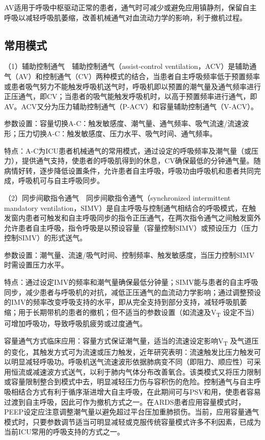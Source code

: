 AV适用于呼吸中枢驱动正常的患者，通气时可减少或避免应用镇静剂，保留自主呼吸以减轻呼吸肌萎缩，改善机械通气对血流动力学的影响，利于撤机过程。

\subsection{常用模式}

（1）辅助控制通气　辅助控制通气（assist-control
ventilation，ACV）是辅助通气（AV）和控制通气（CV）两种模式的结合，当患者自主呼吸频率低于预置频率或患者吸气努力不能触发呼吸机送气时，呼吸机即以预置的潮气量及通气频率进行正压通气，即CV；当患者的吸气能触发呼吸机时，以高于预置频率进行通气，即AV。ACV又分为压力辅助控制通气（P-ACV）和容量辅助控制通气（V-ACV）。

参数设置：容量切换A-C：触发敏感度、潮气量、通气频率、吸气流速/流速波形；压力切换A-C：触发敏感度、压力水平、吸气时间、通气频率。

特点：A-C为ICU患者机械通气的常用模式，通过设定的呼吸频率及潮气量（或压力），提供通气支持，使患者的呼吸肌得到的休息，CV确保最低的分钟通气量。随病情好转，逐步降低设置条件，允许患者自主呼吸，呼吸功由呼吸机和患者共同完成，呼吸机可与自主呼吸同步。

（2）同步间歇指令通气　同步间歇指令通气（synchronized intermittent
mandatory
ventilation，SIMV）是自主呼吸与控制通气相结合的呼吸模式，在触发窗内患者可触发和自主呼吸同步的指令正压通气，在两次指令通气之间触发窗外允许患者自主呼吸，指令呼吸是以预设容量（容量控制SIMV）或预设压力（压力控制SIMV）的形式送气。

参数设置：潮气量、流速/吸气时间、控制频率、触发敏感度，当压力控制SIMV时需设置压力水平。

特点：通过设定IMV的频率和潮气量确保最低分钟量；SIMV能与患者的自主呼吸同步，减少患者与呼吸机的对抗，减低正压通气的血流动力学影响；通过调整预设的IMV的频率改变呼吸支持的水平，即从完全支持到部分支持，减轻呼吸肌萎缩；用于长期带机的患者的撤机；但不适当的参数设置（如流速及V\textsubscript{T}
设定不当）可增加呼吸功，导致呼吸肌疲劳或过度通气。

容量通气方式临床应用：容量方式保证潮气量，适当的流速设定影响V\textsubscript{T}
及气道压的变化，其触发方式可为流速或压力触发，近年研究表明：流速触发比压力触发可以明显减轻呼吸功。呼吸机送气流速波形依据肺病变不同（即阻力、顺应性）可采用恒流或减速波方式送气，以利于肺内气体分布改善氧合。该类模式又将压力限制或容量限制整合到模式中去，明显减轻压力伤与容积伤的危险。控制通气与自主呼吸相结合方式有利于循序渐进增大自主呼吸，在此期间可与PSV和用，使患者容易过渡到自主呼吸，因此可作为撤机方式之一。在ARDS患者应用容量模式时，PEEP设定应注意调整潮气量以避免超过平台压加重肺损伤。当前，应用容量通气模式时，只要参数调节适当可明显减轻或克服传统容量模式许多不利因素，已成为当前ICU常用的呼吸支持的方式之一。

